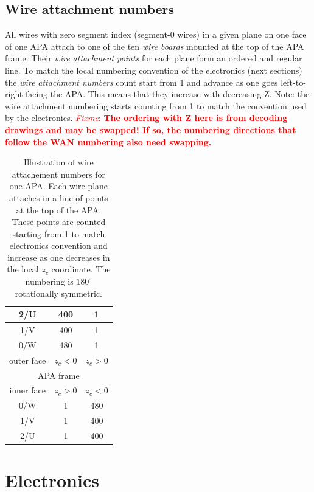 \documentclass[pdftex,12pt,letter]{article}
\newcommand{\fixme}[1]{\textcolor{red}{\textit{Fixme}: \textbf{#1}}}
\begin{document}
\subsection{Wire attachment numbers}

All wires with zero segment index (segment-0 wires) in a given plane
on one face of one APA attach to one of the ten \textit{wire boards}
mounted at the top of the APA frame.  Their \textit{wire attachment
  points} for each plane form an ordered and regular line. 
To match the local numbering convention of the electronics (next
sections) the \textit{wire attachment numbers} count start from 1 and
advance as one goes left-to-right facing the APA.  This means that
they increase with decreasing Z.  Note: the wire attachment numbering
starts counting from 1 to match the convention used by the
electronics. \fixme{The ordering with Z here is from decoding drawings
  and may be swapped!  If so, the numbering directions that follow the
  WAN numbering also need swapping.}

\begin{table}[htp]
  \centering
  \begin{tabular}[h]{ccc}
    \hline
    2/U & 400 & 1 \\
    \hline
    1/V & 400 & 1 \\
    \hline
    0/W & 480 & 1 \\
    \hline
    outer face & $z_c<0$  & $z_c>0$\\
    \hline
    \multicolumn{3}{|c|}{APA frame}\\
    \hline
    inner face & $z_c>0$ & $z_c<0$\\
    \hline
    0/W & 1 & 480 \\
    \hline
    1/V & 1 & 400 \\
    \hline
    2/U & 1 & 400 \\
    \hline
  \end{tabular}
  \caption{Illustration of wire attachement numbers for one APA.  Each wire plane attaches in a line of points at the top of the APA.  These points are counted starting from 1 to match electronics convention and increase as one decreases in the local $z_c$ coordinate.  The numbering is $180^\circ$ rotationally symmetric.}
  \label{tab:wan}
\end{table}

\section{Electronics}
\end{document}
